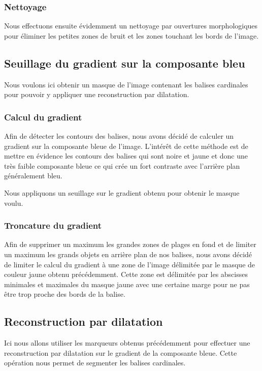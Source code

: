 \documentclass{article}
\begin{document}
\subsubsection{Nettoyage}
Nous effectuons ensuite évidemment un nettoyage par ouvertures morphologiques
pour éliminer les petites zones de bruit et les zones touchant les bords de
l'image.

\subsection{Seuillage du gradient sur la composante bleu}

Nous voulons ici obtenir un masque de l'image contenant les balises cardinales
pour pouvoir y appliquer une reconstruction par dilatation.

\subsubsection{Calcul du gradient}
Afin de détecter les contours des balises, nous avons décidé de calculer un
gradient sur la composante bleue de l'image. L'intérêt de cette méthode est de
mettre en évidence les contours des balises qui sont noire et jaune et donc une
très faible composante bleue ce qui crée un fort contraste avec l'arrière plan
généralement bleu.

Nous appliquons un seuillage sur le gradient obtenu pour obtenir le masque
voulu.

\subsubsection{Troncature du gradient}
Afin de supprimer un maximum les grandes zones de plages en fond et de limiter
un maximum les grands objets en arrière plan de nos balises, nous avons décidé
de limiter le calcul du gradient à une zone de l'image délimitée par le masque
de couleur jaune obtenu précédemment. Cette zone est délimitée par les
abscisses minimales et maximales du masque jaune avec une certaine marge pour
ne pas être trop proche des bords de la balise.

\subsection{Reconstruction par dilatation}

Ici nous allons utiliser les marqueurs obtenus précédemment pour effectuer une
reconstruction par dilatation sur le gradient de la composante bleue. Cette
opération nous permet de segmenter les balises cardinales.
\end{document}
